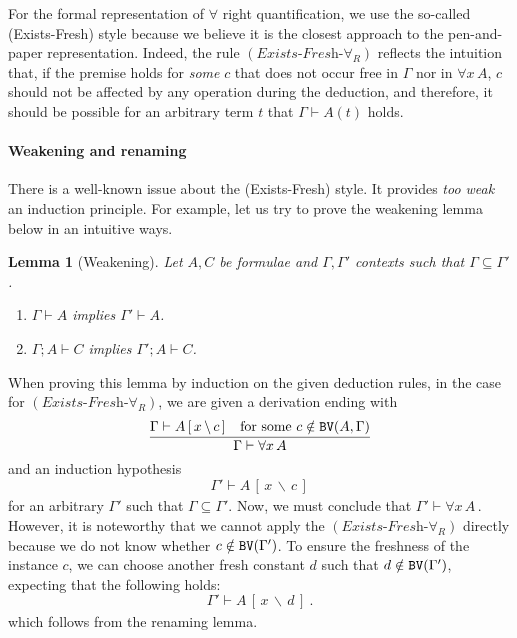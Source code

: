 \documentclass{svjour3}                     %
\newtheorem{lem}[thm]{Lemma}
\newcommand{\seq}[2]{\infer{#2}{#1}}
\newcommand{\Ga}{\Gamma}
\newcommand{\vd}{\vdash}
\newcommand{\subst}[4]{#1\,[\,#2\, \backslash\, #3\,]_{#4}}
\newcommand{\tm}{\subseteq}
\newcommand{\scol}{\mathop{;}}
\newcommand{\tPH}{\textup{\tt BV}}
\begin{document}
For the formal representation of $\forall$ right quantification, we use the so-called (Exists-Fresh) style because we believe it is the closest approach to the pen-and-paper representation. Indeed, the rule $(\textit{Exists-Fresh-}\forall_R)$ reflects the intuition that, if the premise holds for {\em some} $c$ that does not occur free in $\Ga$ nor in $\forall x\, A$, $c$ should not be affected by any operation during the deduction, and therefore, it should be possible for an arbitrary term $t$ that $\Ga \vd A(t)$ holds.

\paragraph{\bf Weakening and renaming}
There is a well-known issue about the (Exists-Fresh) style. It provides \textit{too weak} an induction principle. For example, let us try to prove the weakening lemma below in an intuitive ways.

\begin{lem}[Weakening]\label{weakening}
  Let $A, C$ be formulae and $\Ga, \Ga'$ contexts such that $\Ga \tm \Ga'$.
  \begin{enumerate}
  \item $\Ga \vd A$ implies $\Ga' \vd A$.
  \item $\Ga \scol A \vd C$ implies $\Ga' \scol A \vd C$.
  \end{enumerate}
\end{lem}

When proving this lemma by induction on the given deduction rules, in the case for $(\textit{Exists-Fresh-}\forall_R)$, we are given a derivation ending with
\[
\seq{\Ga \vd \subst{A}{x}{c}{} & \text{for some } c \notin \tPH(A, \Ga)}{\Ga\vd  \forall x\, A}
\]
and an induction hypothesis 
\begin{equation*}\label{c-fresh}
\Ga' \vd \subst{A}{x}{c}{}
\end{equation*}
for an arbitrary $\Ga'$ such that $\Ga \subseteq \Ga'$. Now, we must conclude that $\Ga' \vd \forall x\, A$\,. However, it is noteworthy that we cannot apply the $(\textit{Exists-Fresh-}\forall_R)$ directly because we do not know whether $c \notin \tPH(\Ga')$. To ensure the freshness of the instance $c$, we can choose another fresh constant $d$ such that $d \notin \tPH(\Ga')$, expecting that the following holds:
\begin{equation*}\label{d-fresh}
\Ga' \vd \subst{A}{x}{d}{}\,.
\end{equation*}
which follows from the renaming lemma.
\end{document}
